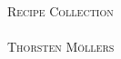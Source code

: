 \begin{titlepage}
\begin{center}
\textsc{\huge Recipe Collection} \\[2cm]
\HRule \\[1cm]
\textsc{\large Thorsten M\"ollers} \\[1cm]
\HRule \\[1cm]
\end{center}
\end{titlepage}
